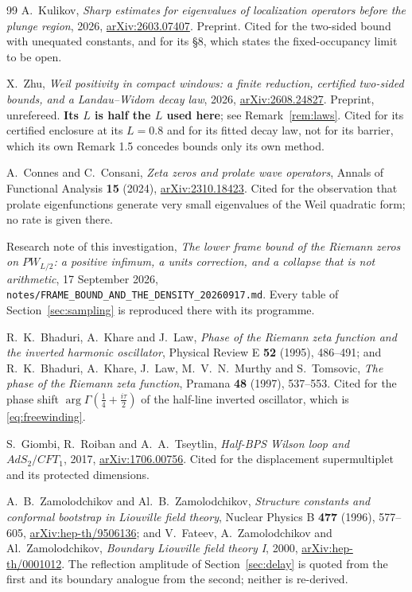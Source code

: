 \begin{thebibliography}{99}
A.~Kulikov, \emph{Sharp estimates for eigenvalues of localization operators
before the plunge region}, 2026,
\href{https://arxiv.org/abs/2603.07407}{arXiv:2603.07407}. Preprint. Cited for
the two-sided bound with unequated constants, and for its \S8, which states the
fixed-occupancy limit to be open.

X.~Zhu, \emph{Weil positivity in compact windows: a finite reduction, certified
two-sided bounds, and a Landau--Widom decay law}, 2026,
\href{https://arxiv.org/abs/2608.24827}{arXiv:2608.24827}. Preprint,
unrefereed. \textbf{Its $L$ is half the $L$ used here}; see
Remark~\ref{rem:laws}. Cited for its certified enclosure at its $L=0.8$ and for
its fitted decay law, not for its barrier, which its own Remark 1.5 concedes
bounds only its own method.

A.~Connes and C.~Consani, \emph{Zeta zeros and prolate wave operators}, Annals of
Functional Analysis \textbf{15} (2024),
\href{https://arxiv.org/abs/2310.18423}{arXiv:2310.18423}. Cited for the
observation that prolate eigenfunctions generate very small eigenvalues of the
Weil quadratic form; no rate is given there.

Research note of this investigation, \emph{The lower frame bound of the Riemann
zeros on $PW_{L/2}$: a positive infimum, a units correction, and a collapse that
is not arithmetic}, 17 September 2026,
\texttt{notes/FRAME\_BOUND\_AND\_THE\_DENSITY\_20260917.md}. Every table of
Section~\ref{sec:sampling} is reproduced there with its programme.

R.~K.~Bhaduri, A.~Khare and J.~Law, \emph{Phase of the Riemann zeta function and
the inverted harmonic oscillator}, Physical Review E \textbf{52} (1995),
486--491; and R.~K.~Bhaduri, A.~Khare, J.~Law, M.~V.~N.~Murthy and S.~Tomsovic,
\emph{The phase of the Riemann zeta function}, Pramana \textbf{48} (1997),
537--553. Cited for the phase shift $\arg\Gamma(\frac14+\frac{i\tau}2)$ of the
half-line inverted oscillator, which is \eqref{eq:freewinding}.

S.~Giombi, R.~Roiban and A.~A.~Tseytlin, \emph{Half-BPS Wilson loop and
$AdS_2/CFT_1$}, 2017, \href{https://arxiv.org/abs/1706.00756}{arXiv:1706.00756}.
Cited for the displacement supermultiplet and its protected dimensions.

A.~B.~Zamolodchikov and Al.~B.~Zamolodchikov, \emph{Structure constants and
conformal bootstrap in Liouville field theory}, Nuclear Physics B \textbf{477}
(1996), 577--605,
\href{https://arxiv.org/abs/hep-th/9506136}{arXiv:hep-th/9506136}; and
V.~Fateev, A.~Zamolodchikov and Al.~Zamolodchikov, \emph{Boundary Liouville field
theory I}, 2000, \href{https://arxiv.org/abs/hep-th/0001012}{arXiv:hep-th/0001012}.
The reflection amplitude of Section~\ref{sec:delay} is quoted from the first and
its boundary analogue from the second; neither is re-derived.


\end{thebibliography}
